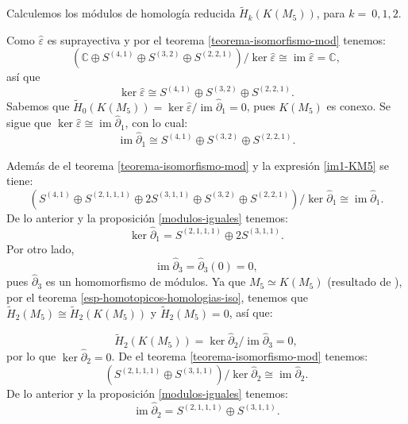 \documentclass[12pt]{book}
\theoremstyle{definition}
\DeclareMathOperator{\im}{im}
\newcounter{in}
\begin{document}
Calculemos los módulos de homología reducida $\widetilde
H_{k}(K(M_{5}))$, para $k=~0,1,2$.

Como $\widehat\varepsilon$ es suprayectiva y por el teorema \ref{teorema-isomorfismo-mod} tenemos:
\begin{equation*}
  (\mathbb{C}\oplus S^{(4,1)}\oplus S^{(3,2)}\oplus
  S^{(2,2,1)})/\ker\widehat\varepsilon\cong \im \widehat\varepsilon=\mathbb{C},
\end{equation*}
así que
\begin{equation*}
  \label{ker0-KM5}
  \ker\widehat\varepsilon\cong S^{(4,1)} \oplus S^{(3,2)}\oplus S^{(2,2,1)}.
\end{equation*}
Sabemos que $\widetilde H_{0}(K(M_{5}))=\ker \widehat\varepsilon/\im
\widehat\partial_{1}=0$, pues $K(M_{5})$ es conexo. Se sigue que $\ker \widehat\varepsilon\cong
\im\widehat\partial_{1}$, con lo cual:
\begin{equation}
  \label{im1-KM5}
  \im \widehat\partial_{1}\cong S^{(4,1)} \oplus S^{(3,2)}\oplus S^{(2,2,1)}.
\end{equation}

Además de el teorema \ref{teorema-isomorfismo-mod} y la expresión \ref{im1-KM5} se tiene:
$$(S^{(4,1)}\oplus S^{(2,1,1,1)}\oplus 2S^{(3,1,1)}\oplus S^{(3,2)}
\oplus S^{(2,2,1)})/\ker \widehat\partial_{1}\cong \im \widehat\partial_{1}.$$
De lo anterior y la proposición \ref{modulos-iguales} tenemos:
\begin{equation}
  \label{ker1-KM5}
  \ker \widehat\partial_{1}=S^{(2,1,1,1)}\oplus 2S^{(3,1,1)}.
\end{equation}
Por otro lado,
\begin{equation*}
  \im\widehat\partial_{3}=\widehat\partial_{3}(0)=0,
  \label{im3-KM5}
\end{equation*}
pues $\widehat\partial_{3}$ es un homomorfismo de módulos. Ya que
$M_{5}\simeq K(M_{5})$ (resultado de \cite{larrion2009clique}), por el teorema
\ref{esp-homotopicos-homologias-iso}, tenemos que $\widetilde
H_{2}(M_{5})\cong\widetilde H_{2}(K(M_{5}))$ y  $\widetilde H_{2}(M_{5})=0$, así que:

\begin{equation*}
\widetilde H_{2}(K(M_{5}))=\ker \widehat\partial_{2}/\im \widehat\partial_{3}=0,
\end{equation*}
por lo que $\ker \widehat\partial_{2}=0$. De el teorema
\ref{teorema-isomorfismo-mod} tenemos:
$$(S^{(2,1,1,1)}\oplus S^{(3,1,1)})/\ker \widehat\partial_{2}\cong \im
\widehat\partial_{2}.$$
De lo anterior y la proposición \ref{modulos-iguales} tenemos:
\begin{equation}
  \im \widehat\partial_{2}=S^{(2,1,1,1)}\oplus S^{(3,1,1)}.
  \label{im2-KM5}
\end{equation}
\end{document}
